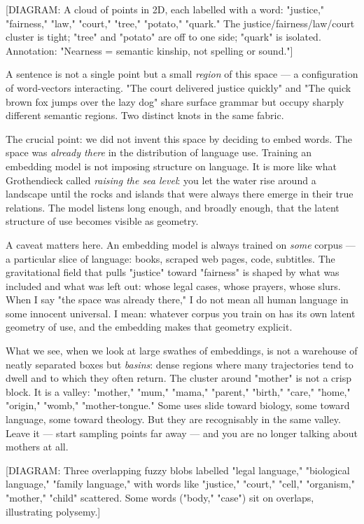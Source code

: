 \documentclass[12pt,a4paper]{article}
\begin{document}
[DIAGRAM: A cloud of points in 2D, each labelled with a word: "justice," "fairness," "law," "court," "tree," "potato," "quark." The justice/fairness/law/court cluster is tight; "tree" and "potato" are off to one side; "quark" is isolated. Annotation: "Nearness = semantic kinship, not spelling or sound."]

A sentence is not a single point but a small \textit{region} of this space --- a configuration of word-vectors interacting. "The court delivered justice quickly" and "The quick brown fox jumps over the lazy dog" share surface grammar but occupy sharply different semantic regions. Two distinct knots in the same fabric.

The crucial point: we did not invent this space by deciding to embed words. The space was \textit{already there} in the distribution of language use. Training an embedding model is not imposing structure on language. It is more like what Grothendieck called \textit{raising the sea level}: you let the water rise around a landscape until the rocks and islands that were always there emerge in their true relations. The model listens long enough, and broadly enough, that the latent structure of use becomes visible as geometry.

A caveat matters here. An embedding model is always trained on \textit{some} corpus --- a particular slice of language: books, scraped web pages, code, subtitles. The gravitational field that pulls "justice" toward "fairness" is shaped by what was included and what was left out: whose legal cases, whose prayers, whose slurs. When I say "the space was already there," I do not mean all human language in some innocent universal. I mean: whatever corpus you train on has its own latent geometry of use, and the embedding makes that geometry explicit.

What we see, when we look at large swathes of embeddings, is not a warehouse of neatly separated boxes but \textit{basins}: dense regions where many trajectories tend to dwell and to which they often return. The cluster around "mother" is not a crisp block. It is a valley: "mother," "mum," "mama," "parent," "birth," "care," "home," "origin," "womb," "mother-tongue." Some uses slide toward biology, some toward language, some toward theology. But they are recognisably in the same valley. Leave it --- start sampling points far away --- and you are no longer talking about mothers at all.

[DIAGRAM: Three overlapping fuzzy blobs labelled "legal language," "biological language," "family language," with words like "justice," "court," "cell," "organism," "mother," "child" scattered. Some words ("body," "case") sit on overlaps, illustrating polysemy.]
\end{document}
